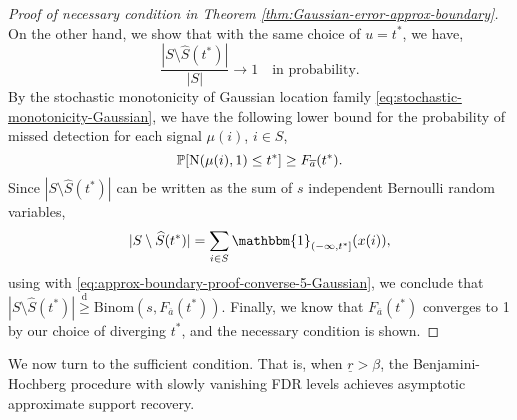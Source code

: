 \begin{proof}[Proof of necessary condition in Theorem \ref{thm:Gaussian-error-approx-boundary}]
On the other hand, we show that with the same choice of $u = t^*$, we have,
\begin{equation} \label{eq:approx-boundary-proof-converse-4-Gaussian}
    \frac{|{S}\setminus\widehat{S}(t^*)|}{|{S}|}\to 1 \quad \text{in probability}.
\end{equation}
By the stochastic monotonicity of Gaussian location family \eqref{eq:stochastic-monotonicity-Gaussian}, we have the following lower bound for the probability of missed detection for each signal $\mu(i)$, $i\in S$, 
\begin{equation} \label{eq:approx-boundary-proof-converse-5-Gaussian}
    \P[\mathrm{N}(\mu(i), 1) \le t^*] \ge F_{\overline{a}}(t^*).
\end{equation}
Since $|{S}\setminus\widehat{S}(t^*)|$ can be written as the sum of $s$ independent Bernoulli random variables,
\begin{equation*}
    |{S}\setminus\widehat{S}(t^*)| = \sum_{i\in S} \mathbbm{1}_{(-\infty, t^*]}(x(i)),
\end{equation*}
using with \eqref{eq:approx-boundary-proof-converse-5-Gaussian}, we conclude that $|{S}\setminus\widehat{S}(t^*)| \stackrel{\mathrm{d}}{\ge} \text{Binom}(s, {F_{\overline{a}}}(t^*))$.
Finally, we know that ${F_{\overline{a}}}(t^*)$ converges to 1 by our choice of diverging $t^*$, and the necessary condition is shown.
\end{proof}

We now turn to the sufficient condition. 
That is, when $\underline{r} > \beta$, the Benjamini-Hochberg procedure with slowly vanishing FDR levels achieves asymptotic approximate support recovery.


